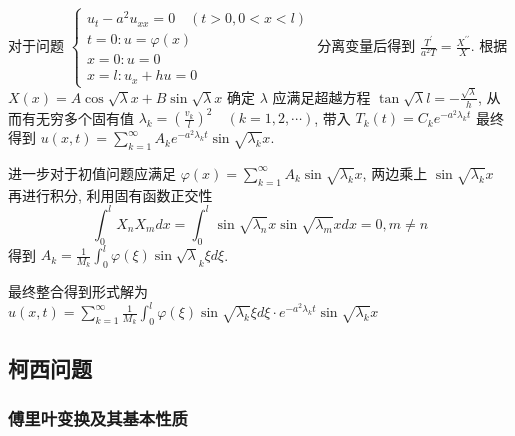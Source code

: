 \documentclass[10pt]{yerbaformat}
\begin{document}
\par 对于问题 $\label{chubian} \left\{\begin{array}{l}u_{t}-a^{2} u_{x x}=0 \quad(t>0,0<x<l) \\ t=0: u=\varphi(x) \\ x=0: u=0 \\ x=l: u_{x}+h u=0\end{array}\right.$ 分离变量后得到 $\frac{T^{\prime}}{a^{2} T}=\frac{X^{\prime \prime}}{X}$. 根据 $X(x)=A \cos \sqrt{\lambda} x+B \sin \sqrt{\lambda} x$ 确定 $\lambda$ 应满足超越方程 $\tan \sqrt{\lambda} l=-\frac{\sqrt{\lambda}}{h}$, 从而有无穷多个固有值 $\lambda_{k}=\left(\frac{v_{k}}{l}\right)^{2} \quad(k=1,2, \cdots)$, 带入 $T_{k}(t)=C_{k} e^{-a^{2} \lambda_{k} t}$ 最终得到 $u(x, t)=\sum_{k=1}^{\infty} A_{k} e^{-a^{2} \lambda_{k} t} \sin \sqrt{\lambda_{k}} x$.

\par 进一步对于初值问题应满足 $\varphi(x)=\sum_{k=1}^{\infty} A_{k} \sin \sqrt{\lambda_{k}} x$, 两边乘上 $\sin \sqrt{\lambda_{k}} x$ 再进行积分, 利用固有函数正交性 $$\int_{0}^{l} X_{n} X_{m} d x=\int_{0}^{l} \sin \sqrt{\lambda_{n}} x \sin \sqrt{\lambda_{m}} x d x=0, m \neq n$$ 得到 $A_{k}=\frac{1}{M_{k}} \int_{0}^{l} \varphi(\xi) \sin \sqrt{\lambda}_{k} \xi d \xi$.

\par 最终整合得到形式解为 $u(x, t)=\sum_{k=1}^{\infty} \frac{1}{M_{k}} \int_{0}^{l} \varphi(\xi) \sin \sqrt{\lambda_{k}} \xi d \xi \cdot e^{-a^{2} \lambda_{k} t} \sin \sqrt{\lambda_{k}} x$


\subsection{柯西问题}
\subsubsection{傅里叶变换及其基本性质}
\end{document}

